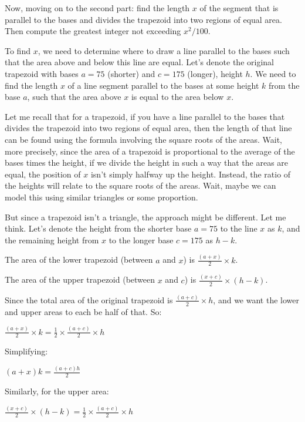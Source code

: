 \begin{tcolorbox}[
  title=Multiagent Collaborative Reasoning Trace Data Sample,
  breakable,
  colback=white,
  colframe=black
]
Now, moving on to the second part: find the length \( x \) of the segment that is parallel to the bases and divides the trapezoid into two regions of equal area. Then compute the greatest integer not exceeding \( x^2 / 100 \).

To find \( x \), we need to determine where to draw a line parallel to the bases such that the area above and below this line are equal. Let's denote the original trapezoid with bases \( a = 75 \) (shorter) and \( c = 175 \) (longer), height \( h \). We need to find the length \( x \) of a line segment parallel to the bases at some height \( k \) from the base \( a \), such that the area above \( x \) is equal to the area below \( x \).

Let me recall that for a trapezoid, if you have a line parallel to the bases that divides the trapezoid into two regions of equal area, then the length of that line can be found using the formula involving the square roots of the areas. Wait, more precisely, since the area of a trapezoid is proportional to the average of the bases times the height, if we divide the height in such a way that the areas are equal, the position of \( x \) isn't simply halfway up the height. Instead, the ratio of the heights will relate to the square roots of the areas. Wait, maybe we can model this using similar triangles or some proportion.

But since a trapezoid isn't a triangle, the approach might be different. Let me think. Let's denote the height from the shorter base \( a = 75 \) to the line \( x \) as \( k \), and the remaining height from \( x \) to the longer base \( c = 175 \) as \( h - k \).

The area of the lower trapezoid (between \( a \) and \( x \)) is \( \frac{(a + x)}{2} \times k \).

The area of the upper trapezoid (between \( x \) and \( c \)) is \( \frac{(x + c)}{2} \times (h - k) \).

Since the total area of the original trapezoid is \( \frac{(a + c)}{2} \times h \), and we want the lower and upper areas to each be half of that. So:

\( \frac{(a + x)}{2} \times k = \frac{1}{2} \times \frac{(a + c)}{2} \times h \)

Simplifying:

\( (a + x)k = \frac{(a + c)h}{2} \)

Similarly, for the upper area:

\( \frac{(x + c)}{2} \times (h - k) = \frac{1}{2} \times \frac{(a + c)}{2} \times h \)


\end{tcolorbox}
